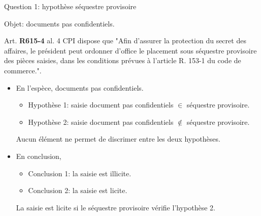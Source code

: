 \begin{frame}{Question 1: hypothèse séquestre provisoire}

Objet: documents pas confidentiels.

\begin{block}{}
Art. \textbf{R615-4} al. 4 CPI dispose que "Afin d'assurer la protection du secret des affaires, 
le président peut ordonner d'office le placement sous séquestre provisoire des pièces saisies, 
dans les conditions prévues à l'article R. 153-1 du code de commerce.".
\end{block}

\begin{itemize}
    \item En l'espèce, documents pas confidentiels.
    \begin{itemize}
        \item Hypothèse 1: saisie document pas confidentiels $\in$ séquestre provisoire. 
        \item Hypothèse 2: saisie document pas confidentiels $\notin$ séquestre provisoire.
    \end{itemize}
    Aucun élément ne permet de discrimer entre les deux hypothèses.
    \item En conclusion,
    \begin{itemize}
        \item Conclusion 1: la saisie est illicite.
        \item Conclusion 2: la saisie est licite.
    \end{itemize}
    La saisie est licite si le séquestre provisoire vérifie l'hypothèse 2.
\end{itemize}

\end{frame}




